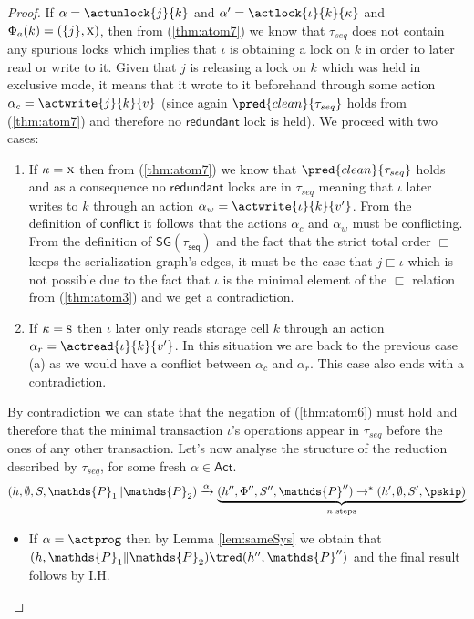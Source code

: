 \begin{thm}
{\begin{proof}
If $\alpha = \actunlock{j}{k}$ and $\alpha' = \actlock{\iota}{k}{\kappa}$ and $\Phi_a(k) = (\{j\}, \textsc{x})$, then from (\ref{thm:atom7}) we know that $\tau_{seq}$ does not contain any spurious locks which implies that $\iota$ is obtaining a lock on $k$ in order to later read or write to it. Given that $j$ is releasing a lock on $k$ which was held in exclusive mode, it means that it wrote to it beforehand through some action $\alpha_c = \actwrite{j}{k}{v}$ (since again $\pred{clean}{\tau_{seq}}$ holds from (\ref{thm:atom7}) and therefore no $\mathsf{redundant}$ lock is held). We proceed with two cases:
\begin{enumerate}
	\item If $\kappa = \textsc{x}$ then from (\ref{thm:atom7}) we know that $\pred{clean}{\tau_{seq}}$ holds and as a consequence no $\mathsf{redundant}$ locks are in $\tau_{seq}$ meaning that $\iota$ later writes to $k$ through an action $\alpha_w = \actwrite{\iota}{k}{v'}$. From the definition of $\mathsf{conflict}$ it follows that the actions $\alpha_c$ and $\alpha_w$ must be conflicting. From the definition of $\mathsf{SG(\tau_{seq})}$ and the fact that the strict total order $\sqsubset$ keeps the serialization graph's edges, it must be the case that $j \sqsubset \iota$ which is not possible due to the fact that $\iota$ is the minimal element of the $\sqsubset$ relation from (\ref{thm:atom3}) and we get a contradiction.
	
	\item If $\kappa = \textsc{s}$ then $\iota$ later only reads storage cell $k$ through an action $\alpha_r = \actread{\iota}{k}{v'}$. In this situation we are back to the previous case (a) as we would have a conflict between $\alpha_c$ and $\alpha_r$. This case also ends with a contradiction.
\end{enumerate}
By contradiction we can state that the negation of (\ref{thm:atom6}) must hold and therefore that the minimal transaction $\iota$'s operations appear in $\tau_{seq}$ before the ones of any other transaction. Let's now analyse the structure of the reduction described by $\tau_{seq}$, for some fresh $\alpha \in \mathsf{Act}$.
\[
	(h, \emptyset, S, \mathds{P}_1 \| \mathds{P}_2) \xrightarrow{\alpha}
	\underbrace{(h'', \Phi'', S'', \mathds{P}'') \rightarrow^* (h', \emptyset, S', \pskip)}_{n \text{ steps}}
\]
\begin{itemize}
	\item If $\alpha = \actprog$ then by Lemma \ref{lem:sameSys} we obtain that $(h, \mathds{P}_1 \| \mathds{P}_2) \tred (h'', \mathds{P}'')$ and the final result follows by I.H.
	

\end{itemize}
\end{proof}}
\end{thm}
